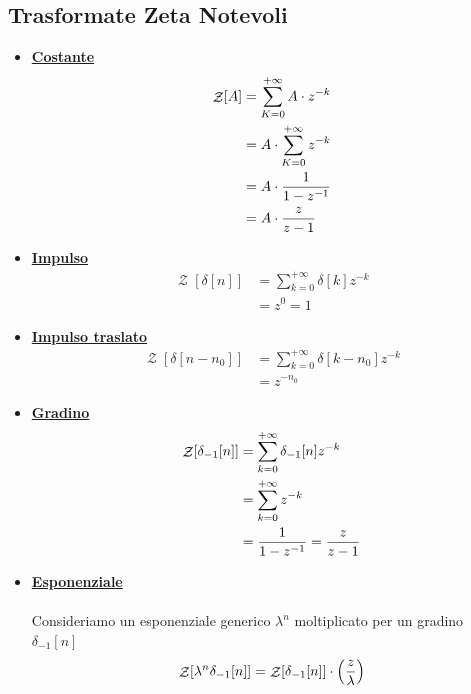 \documentclass{article}
\newcommand{\Ztransf}{\mathop{\mathcal{Z}}}
\begin{document}
		\subsection{Trasformate Zeta Notevoli}
			\begin{itemize}
				\item \underline{\textbf{Costante}} \\
					  \[
					  	\begin{aligned}
					  		\Ztransf[A] &= \sum_{K=0}^{+\infty} {A\cdot z^{-k}} \\
							&= A \cdot \sum_{K=0}^{+\infty} {z^{-k}} \\
							&= A \cdot {{1}\over{1 - z^{-1}}} \\
							&= A \cdot {{z}\over{z - 1}}
					  	\end{aligned}
					  \]
				\item \underline{\textbf{Impulso}} \\
					  \[
					  	\begin{aligned}
					  		\Ztransf[\delta[n]] &= \sum_{k=0}^{+\infty} {\delta[k] z^{-k}} \\
							&= z^0 = 1
					  	\end{aligned}
					  \]
				\item \underline{\textbf{Impulso traslato}} \\
					  \[
					  	\begin{aligned}
					  		\Ztransf[\delta[n - n_0]] &= \sum_{k=0}^{+\infty} {\delta[k-n_0]z^{-k}} \\
							&= z^{-n_0}
					  	\end{aligned}
					  \]
				\item \underline{\textbf{Gradino}} \\
					  \[
					  	\begin{aligned}
							\Ztransf[\delta_{-1}[n]] &= \sum_{k=0}^{+\infty} {\delta_{-1}[n] z^{-k}} \\
							&= \sum_{k=0}^{+\infty} {z^{-k}} \\
							&= {{1}\over{1 - z^{-1}}} = {{z}\over{z - 1}}
					  	\end{aligned}
					  \]
				\item \underline{\textbf{Esponenziale}} \\
					  \\
					  Consideriamo un esponenziale generico $ \lambda^n $ moltiplicato per un gradino $ \delta_{-1}[n] $
					  \[
					  	\begin{aligned}
							\Ztransf[\lambda^n\delta_{-1}[n]] &= \Ztransf[\delta_{-1}[n]] \cdot \Big( {{z}\over{\lambda}} \Big) \\

\end{aligned}\]
\end{itemize}
\end{document}
